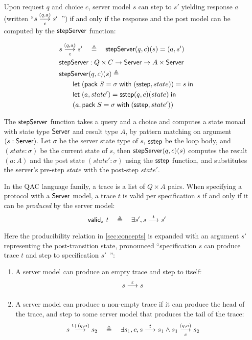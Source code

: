 \begin{definition}
  \label{def:server-step}
  Upon request $q$ and choice $c$, server model $s$ can step to $s'$ yielding
  response $a$ (written ``$\triggers sc{(q,a)}s'$~'') if and only if the
  response and the post model can be computed by the $\mathsf{stepServer}$ function:

\begin{align*}
  &\triggers sc{(q,a)}s'\quad\triangleq\quad\stepServer(q,c)(s)=(a,s')\\
  &\stepServer:Q\times C \to \Server \to A\times \Server \\
  &\stepServer(q,c)(s)\triangleq\\
  &\qquad\letin{(\existT{S}{\sigma}{(\sstep, state)})}{s}\\
  &\qquad\letin{(a,state')}{\sstep(q,c)(state)} \\
  &\qquad(a, \existT{S}{\sigma}{(\sstep, state')})
\end{align*}

The $\mathsf{stepServer}$ function takes a query and a choice and computes a state monad
with state type $\mathsf{Server}$ and result type $A$, by pattern matching on argument
$(s:\mathsf{Server})$.  Let $\sigma$ be the server state type of $s$, $\mathsf{sstep}$ be the
loop body, and $(state:\sigma)$ be the current state of $s$, then
$\mathsf{stepServer}(q,c)(s)$ computes the result $(a:A)$ and the post state
$(state':\sigma)$ using the $\mathsf{sstep}$ function, and substitutes the server's
pre-step $state$ with the post-step $state'$.
\end{definition}

\begin{definition}
  In the QAC language family, a trace is a list of $Q\times A$ pairs.  When
  specifying a protocol with a $\mathsf{Server}$ model, a trace $t$ is valid per
  specification $s$ if and only if it can be {\em produced} by the server model:
  \[\valid s t\quad\triangleq\quad\exists s',\behaves s t s'\]
  Here the producibility relation in \autoref{sec:concepts} is expanded with an
  argument $s'$ representing the post-transition state, pronounced
  ``specification $s$ can produce trace $t$ and step to specification $s'$~'':
  \begin{enumerate}
  \item A server model can produce an empty trace and step to itself:
    \[\behaves s \nil s\]
  \item A server model can produce a non-empty trace if it can produce the head
    of the trace, and step to some server model that produces the tail of the
    trace:
    \[\behaves s {t+(q,a)} s_2\quad\triangleq\quad\exists s_1,c,\behaves s t s_1\wedge\triggers {s_1}c{(q,a)}s_2\]
  \end{enumerate}
\end{definition}

